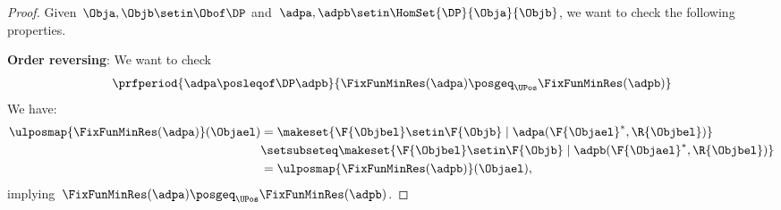 \begin{proof}
    Given~$\Obja,\Objb \setin \Obof\DP$ and~$\adpa,\adpb \setin \HomSet{\DP}{\Obja}{\Objb}$, we want to check the following properties.

    \textbf{Order reversing}:
    We want to check
    \begin{equation}
        \prfperiod{\adpa \posleqof\DP \adpb}{\FixFunMinRes(\adpa) \posgeq_\UPos \FixFunMinRes(\adpb)}
    \end{equation}
    We have:
    \begin{equation}
        \begin{aligned}
            \ulposmap{\FixFunMinRes(\adpa)}(\Objael) & =\makeset{\F{\Objbel} \setin \F{\Objb} \mid \adpa(\F{\Objael}^*, \R{\Objbel})} \\
                                                     & \setsubseteq \makeset{\F{\Objbel} \setin \F{\Objb} \mid \adpb(\F{\Objael}^*, \R{\Objbel})} \\
                                                     & = \ulposmap{\FixFunMinRes(\adpb)}(\Objael),
        \end{aligned}
    \end{equation}
    implying~$\FixFunMinRes(\adpa) \posgeq_\UPos \FixFunMinRes(\adpb)$.


\end{proof}
